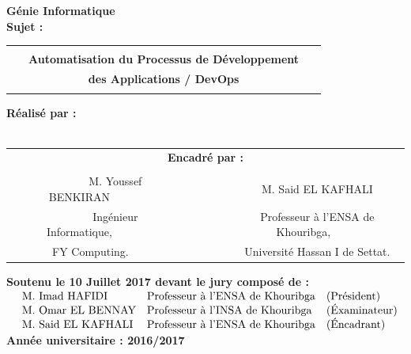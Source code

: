 \documentclass[a4paper,11pt,oneside]{report}
\begin{document}
\begin{titlepage}
        \vspace{0.5em}
    {\LARGE \textbf{G\'enie Informatique}}\\
        \vfill
    {\large \textbf{Sujet :}}\\
        \vspace{1em} 
    \begin{tabular}{|c|}
    \hline
     \\
    \ \ \ {\LARGE \textbf{Automatisation du Processus de Développement}}\ \ \ \\
    {\LARGE \textbf{des Applications / DevOps}}\\
     \\
    \hline
    \end{tabular}
    \vfill
         {\large \textbf{Réalisé par :}}\\
        \vspace{0.5em}
    {\large \@author} \\
        \vfill
    \begin{tabular}{c c}
    \multicolumn{2}{c}{{\large \textbf{Encadré par :}}} \\
     & \\
    \ \ \ \ {\large M. Youssef BENKIRAN}\ \ \ \ \ \ \ \ \ & \ \ \ \ \ {\large M. Said EL KAFHALI} \\
    \ \ \ \ {\large Ingénieur Informatique,}\ \ \ \ \ \ \ \ \ & \ \ \ \ \ {\large Professeur à l'ENSA de Khouribga,}\\
    \ \ \ \ {\large FY Computing.}\ \ \ \ \ \ \ \ \ & \ \ \ \ \ {\large Université Hassan I de Settat.}\\
    \end{tabular}
        \vfill
    {\large \textbf{Soutenu le 10 Juillet 2017 devant le jury composé de :}}\\
    \ \newline
        $\begin{array}{l l l}
        \text{M. Imad HAFIDI} & \text{Professeur à l'ENSA de Khouribga} & \text{(Président)} \\
        \text{M. Omar EL BENNAY} & \text{Professeur à l'INSA de Khouribga} & \text{(\'Examinateur)} \\
        \text{M. Said EL KAFHALI} & \text{Professeur à l'ENSA de Khouribga} & \text{(\'Encadrant)} \\
        \end{array}$\\
        \vfill
    {\large \textbf{Année universitaire : 2016/2017}}
  \end{titlepage}
\end{document}
